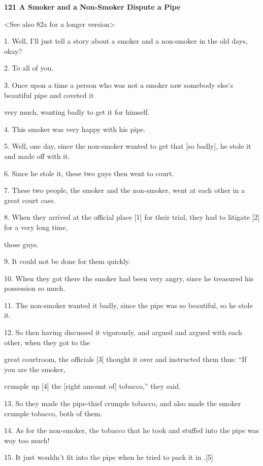 
{\LARGE{}\textbf{121 A Smoker and a Non-Smoker Dispute a Pipe}}

{\LARGE{}<See also 82a for a longer version>}

{\LARGE{}1. Well, I'll just tell a story about a smoker and a non-smoker in the
old days, okay?}

{\LARGE{}2. To all of you.}

{\LARGE{}3. Once upon a time a person who was not a smoker saw somebody else's
beautiful pipe and coveted it     }

{\LARGE{}very much, wanting badly to get it for himself.}

{\LARGE{}4. This smoker was very happy with his pipe.}

{\LARGE{}5. Well, one day, since the non-smoker wanted to get that [so badly],
he stole it and made off with it.}

{\LARGE{}6. Since he stole it, these two guys then went to court.}

{\LARGE{}7. These two people, the smoker and the non-smoker, went at each other
in a great court case.}

{\LARGE{}8. When they arrived at the official place [1] for their trial, they had
to litigate [2] for a very long time,     }

{\LARGE{}those guys.}

{\LARGE{}9. It could not be done for them quickly.}

{\LARGE{}10. When they got there the smoker had been very angry, since he treasured
his possession so much.}

{\LARGE{}11. The non-smoker wanted it badly, since the pipe was so beautiful, so
he stole it.}

{\LARGE{}12. So then having discussed it vigorously, and argued and argued with
each other, when they got to the       }

{\LARGE{}great courtroom, the officials [3] thought it over and instructed them
thus: ``If you are the smoker,       }

{\LARGE{}crumple up [4] the [right amount of] tobacco,'' they said.}

{\LARGE{}13. So they made the pipe-thief crumple tobacco, and also made the smoker
crumple tobacco, both of them.}

{\LARGE{}14. As for the non-smoker, the tobacco that he took and stuffed into the
pipe was way too much!}

{\LARGE{}15. It just wouldn't fit into the pipe when he tried to pack it in .[5]}

